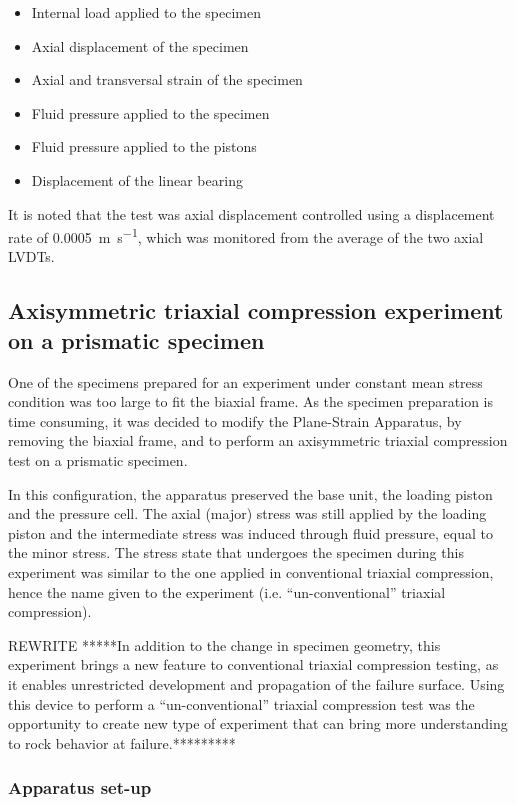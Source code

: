 \begin{itemize}
    \item Internal load applied to the specimen
    \item Axial displacement of the specimen
    \item Axial and transversal strain of the specimen
    \item Fluid pressure applied to the specimen
    \item Fluid pressure applied to the pistons
    \item Displacement of the linear bearing
\end{itemize}

It is noted that the test was axial displacement controlled using a displacement rate of \SI{0.0005}{\meter\per\second}, which was monitored from the average of the two axial LVDTs.

\subsection{Axisymmetric triaxial compression experiment on a prismatic specimen}

One of the specimens prepared for an experiment under constant mean stress condition was too large to fit the biaxial frame. As the specimen preparation is time consuming, it was decided to modify the Plane-Strain Apparatus, by removing the biaxial frame, and to perform an axisymmetric triaxial compression test on a prismatic specimen. 

In this configuration, the apparatus preserved the base unit, the loading piston and the pressure cell. The axial (major) stress was still applied by the loading piston and the intermediate stress was induced through fluid pressure, equal to the minor stress. The stress state that undergoes the specimen during this experiment was similar to the one applied in conventional triaxial compression, hence the name given to the experiment (i.e. “un-conventional” triaxial compression). 

REWRITE *****In addition to the change in specimen geometry, this experiment brings a new feature to conventional triaxial compression testing, as it enables unrestricted development and propagation of the failure surface. Using this device to perform a “un-conventional” triaxial compression test was the opportunity to create new type of experiment that can bring more understanding to rock behavior at failure.*********

\subsubsection{Apparatus set-up}

